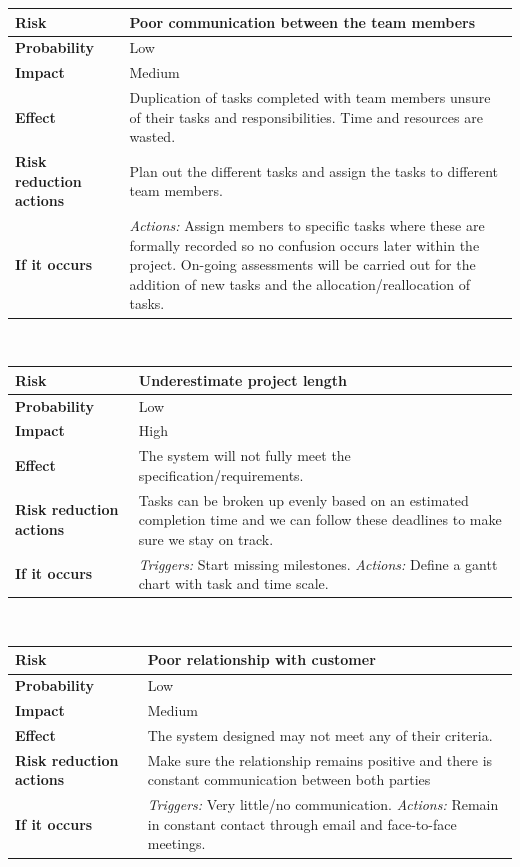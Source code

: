 \noindent
\begin{tabular}{|l || p{10.3cm}|}
\hline
\textbf{Risk} & Poor communication between the team members \\ \hline
\textbf{Probability} & Low \\ \hline
\textbf{Impact} & Medium \\ \hline
\textbf{Effect} & Duplication of tasks completed with team members unsure of their tasks and responsibilities.  Time and resources are wasted.\\ \hline
\textbf{Risk reduction actions} & Plan out the different tasks and assign the tasks to different team members. \\ \hline
\textbf{If it occurs} & \emph{Actions:} Assign members to specific tasks where these are formally recorded so no confusion occurs later within the project.  On-going assessments will be carried out for the addition of new tasks and the allocation/reallocation of tasks.\\
\hline
\end{tabular}\\
\vspace{0.5cm}

\noindent
\begin{tabular}{|l || p{10.3cm}|}
\hline
\textbf{Risk} & Underestimate project length \\ \hline
\textbf{Probability} & Low \\ \hline
\textbf{Impact} & High \\ \hline
\textbf{Effect} & The system will not fully meet the specification/requirements.\\ \hline
\textbf{Risk reduction actions} & Tasks can be broken up evenly based on an estimated completion time and we can follow these deadlines to make sure we stay on track. \\ \hline
\textbf{If it occurs} &  \emph{Triggers:} Start missing milestones.  \emph{Actions:} Define a gantt chart with task and time scale.\\
\hline
\end{tabular}\\
\vspace{0.5cm}

\noindent
\begin{tabular}{|l || p{10.3cm}|}
\hline
\textbf{Risk} & Poor relationship with customer \\ \hline
\textbf{Probability} & Low \\ \hline
\textbf{Impact} & Medium \\ \hline
\textbf{Effect} & The system designed may not meet any of their criteria.\\ \hline
\textbf{Risk reduction actions} & Make sure the relationship remains positive and there is constant communication between both parties \\ \hline
\textbf{If it occurs} &  \emph{Triggers:} Very little/no communication.  \emph{Actions:} Remain in constant contact through email and face-to-face meetings.\\
\hline
\end{tabular}\\
\vspace{0.5cm}

